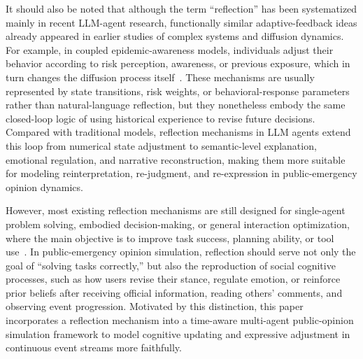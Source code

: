 It should also be noted that although the term “reflection” has been systematized mainly in recent LLM-agent research, functionally similar adaptive-feedback ideas already appeared in earlier studies of complex systems and diffusion dynamics. For example, in coupled epidemic-awareness models, individuals adjust their behavior according to risk perception, awareness, or previous exposure, which in turn changes the diffusion process itself~\citep{funk2009awareness, granell2013awareness}. These mechanisms are usually represented by state transitions, risk weights, or behavioral-response parameters rather than natural-language reflection, but they nonetheless embody the same closed-loop logic of using historical experience to revise future decisions. Compared with traditional models, reflection mechanisms in LLM agents extend this loop from numerical state adjustment to semantic-level explanation, emotional regulation, and narrative reconstruction, making them more suitable for modeling reinterpretation, re-judgment, and re-expression in public-emergency opinion dynamics.

However, most existing reflection mechanisms are still designed for single-agent problem solving, embodied decision-making, or general interaction optimization, where the main objective is to improve task success, planning ability, or tool use~\citep{yao2023react, shinn2023reflexion}. In public-emergency opinion simulation, reflection should serve not only the goal of “solving tasks correctly,” but also the reproduction of social cognitive processes, such as how users revise their stance, regulate emotion, or reinforce prior beliefs after receiving official information, reading others' comments, and observing event progression. Motivated by this distinction, this paper incorporates a reflection mechanism into a time-aware multi-agent public-opinion simulation framework to model cognitive updating and expressive adjustment in continuous event streams more faithfully.
